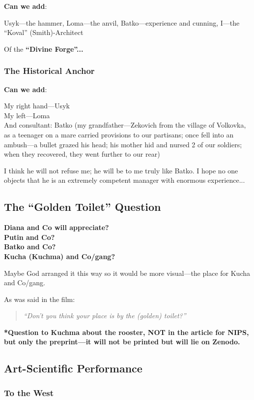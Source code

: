 \documentclass[11pt,a4paper]{article}
\theoremstyle{definition}
\theoremstyle{remark}
\begin{document}
\textbf{Can we add}:

Usyk—the hammer, Loma—the anvil, Batko—experience and cunning, I—the ``Koval'' (Smith)-Architect

Of the \textbf{``Divine Forge''...}

\subsubsection{The Historical Anchor}

\textbf{Can we add}:

My right hand—Usyk \\
My left—Loma \\
And consultant: Batko (my grandfather—Zekovich from the village of Volkovka, as a teenager on a mare carried provisions to our partisans; once fell into an ambush—a bullet grazed his head; his mother hid and nursed 2 of our soldiers; when they recovered, they went further to our rear)

I think he will not refuse me; he will be to me truly like Batko. I hope no one objects that he is an extremely competent manager with enormous experience...

\subsection{The ``Golden Toilet'' Question}

\textbf{Diana and Co will appreciate?} \\
\textbf{Putin and Co?} \\
\textbf{Batko and Co?} \\
\textbf{Kucha (Kuchma) and Co/gang?}

Maybe God arranged it this way so it would be more visual—the place for Kucha and Co/gang.

As was said in the film:

\begin{quote}
\textit{``Don't you think your place is by the (golden) toilet?''}
\end{quote}

\textbf{*Question to Kuchma about the rooster, NOT in the article for NIPS, but only the preprint—it will not be printed but will lie on Zenodo.}

\subsection{Art-Scientific Performance}

\subsubsection{To the West}
\end{document}
